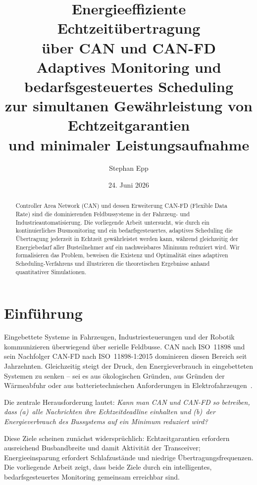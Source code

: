 ﻿\documentclass[a4paper,12pt]{article}
\title{Energieeffiziente Echtzeit\"{u}bertragung\\
       \"{u}ber CAN und CAN-FD\\[0.5ex]
       \large Adaptives Monitoring und bedarfsgesteuertes Scheduling\\
       zur simultanen Gew\"{a}hrleistung von Echtzeitgarantien\\
       und minimaler Leistungsaufnahme}
\author{Stephan Epp}
\date{24. Juni 2026}
\theoremstyle{definition}
\begin{document}
\maketitle

\begin{abstract}
Controller Area Network (CAN) und dessen Erweiterung CAN-FD (Flexible Data Rate) sind
die dominierenden Feldbussysteme in der Fahrzeug- und Industrieautomatisierung.
Die vorliegende Arbeit untersucht, wie durch ein kontinuierliches Busmonitoring und ein
bedarfsgesteuertes, adaptives Scheduling die \"{U}bertragung jederzeit in Echtzeit
gew\"{a}hrleistet werden kann, w\"{a}hrend gleichzeitig der Energiebedarf aller Busteilnehmer
auf ein nachweisbares Minimum reduziert wird.
Wir formalisieren das Problem, beweisen die Existenz und Optimalit\"{a}t eines adaptiven
Scheduling-Verfahrens und illustrieren die theoretischen Ergebnisse anhand
quantitativer Simulationen.
\end{abstract}

\tableofcontents
\newpage

\section{Einf\"{u}hrung}

Eingebettete Systeme in Fahrzeugen, Industriesteuerungen und der Robotik kommunizieren
\"{u}berwiegend \"{u}ber serielle Feldbusse.
CAN nach ISO~11898 \cite{iso11898} und sein Nachfolger CAN-FD nach ISO~11898-1:2015
\cite{canfd_spec} dominieren diesen Bereich seit Jahrzehnten.
Gleichzeitig steigt der Druck, den Energieverbrauch in eingebetteten Systemen zu senken --
sei es aus \"{o}kologischen Gr\"{u}nden, aus Gr\"{u}nden der W\"{a}rmeabfuhr oder aus
batterietechnischen Anforderungen in Elektrofahrzeugen~\cite{ev_energy}.

Die zentrale Herausforderung lautet:
\emph{Kann man CAN und CAN-FD so betreiben, dass (a)~alle Nachrichten ihre Echtzeitdeadline
einhalten und (b)~der Energieverbrauch des Bussystems auf ein Minimum reduziert wird?}

Diese Ziele scheinen zun\"{a}chst widerspr\"{u}chlich: Echtzeitgarantien erfordern ausreichend
Busbandbreite und damit Aktivit\"{a}t der Transceiver; Energieeinsparung erfordert
Schlafzust\"{a}nde und niedrige \"{U}bertragungsfrequenzen.
Die vorliegende Arbeit zeigt, dass beide Ziele durch ein intelligentes,
bedarfsgesteuertes Monitoring gemeinsam erreichbar sind.
\end{document}
